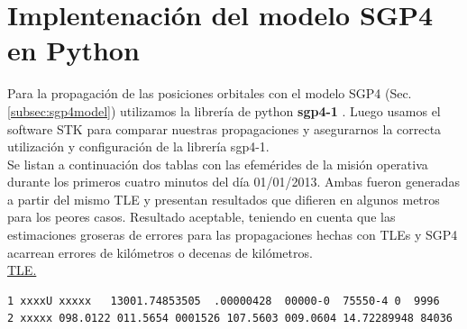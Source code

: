 \section{Implentenaci\'on del modelo SGP4 en Python}

Para la propagaci\'on de las posiciones orbitales con el modelo SGP4 (Sec. \ref{subsec:sgp4model}) utilizamos la librer\'ia de python {\bf{sgp4-1}} \citep{sgp4python}.
Luego usamos el software STK para comparar nuestras propagaciones y asegurarnos la correcta utilizaci\'on y configuraci\'on de la librer\'ia sgp4-1.\\

Se listan a continuaci\'on dos tablas con las efem\'erides de la misi\'on operativa durante los primeros cuatro minutos del d\'ia 01/01/2013.
Ambas fueron generadas a partir del mismo TLE y presentan resultados que difieren en algunos metros para los peores casos. Resultado aceptable, teniendo en cuenta que las estimaciones groseras de errores para las propagaciones hechas con TLEs y SGP4 acarrean errores de kil\'ometros o decenas de kil\'ometros.\\

\underline{TLE.}
{\small
\begin{verbatim}
1 xxxxU xxxxx   13001.74853505  .00000428  00000-0  75550-4 0  9996
2 xxxxx 098.0122 011.5654 0001526 107.5603 009.0604 14.72289948 84036
\end{verbatim}}


\begin{table}[!h]
\centering
{}
\caption{Resultados que genera ARxCODE utilizando la librer\'ia sgp4 de python para la propagaci\'on.}
\end{table}

